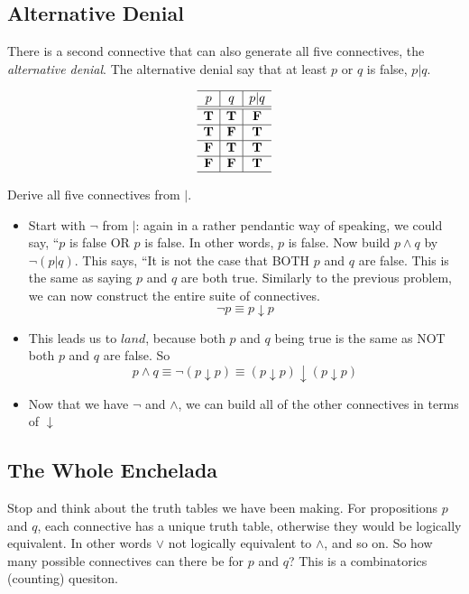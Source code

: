 \subsection*{Alternative Denial}
There is a second connective that can also generate all five connectives, the \emph{alternative denial}.  The alternative denial say that at least $p$ or $q$ is false, $p |  q$.  


\[  \begin{array}{c|c|c}
  \hline  
  p & q & p| q\\
  \hline
  \hline
 \mathbf{T} &  \mathbf{T} &  \mathbf{F}\\
  \hline
 \mathbf{T} &  \mathbf{F} &  \mathbf{T}\\
  \hline
 \mathbf{F} &  \mathbf{T} &  \mathbf{T}\\
  \hline
 \mathbf{F} &  \mathbf{F} &  \mathbf{T}\\
    \hline
    \end{array}\]
    
\begin{problem}
Derive all five connectives from $|$.


\ifKey
\color{red}
\hfill \begin{minipage}{0.5\textwidth}
\begin{itemize}
\item Start with $\neg$ from $|$:  again in a rather pendantic way of speaking, we could say, ``$p$ is false OR $p$ is false. In other words, $p$ is false.  Now build $p \land q$ by $\neg (p|q)$.  This says, ``It is not the case that BOTH $p$ and $q$ are false.  This is the same as saying $p$ and $q$ are both true.  Similarly to the previous problem, we can now construct the entire suite of connectives.
$$\neg p \equiv p\downarrow p $$
\item This leads us to $land$, because both $p$ and $q$ being true is the same as NOT both $p$ and $q$ are false.  So 
$$ p\land q \equiv \neg (p\downarrow p) \equiv (p\downarrow p) \downarrow  (p\downarrow p)$$
\item Now that we have $\neg$ and $\land$, we can build all of the other connectives in terms of $\downarrow$ 
\end{itemize}
\end{minipage}
\color{black}
\fi
\end{problem}

\newpage
\subsection*{The Whole Enchelada}
Stop and think about the truth tables we have been making.  For propositions $p$ and $q$, each connective has a unique truth table, otherwise they would be logically equivalent.  In other words $\lor$ not logically equivalent to $\land$, and so on.   So how many possible connectives can there be for $p$ and $q$?  This is a combinatorics (counting) quesiton.   

